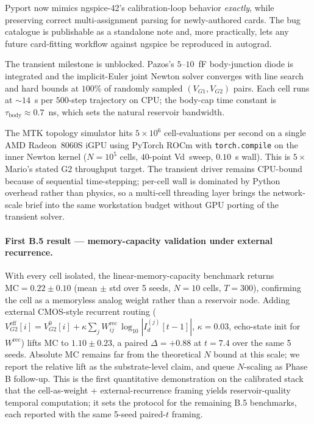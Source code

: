 \documentclass[fontsize=10pt]{article}
\begin{document}
Pyport now mimics ngspice-42's calibration-loop behavior \emph{exactly}, while
preserving correct multi-assignment parsing for newly-authored cards. The bug
catalogue is publishable as a standalone note and, more practically, lets any
future card-fitting workflow against ngspice be reproduced in autograd.

The transient milestone is unblocked. Pazos's $5$--$10$~fF body-junction diode is
integrated and the implicit-Euler joint Newton solver converges with line search and
hard bounds at $100\%$ of randomly sampled $(V_{G1}, V_{G2})$ pairs. Each cell runs at
$\sim 14$~s per $500$-step trajectory on CPU; the body-cap time constant is
$\tau_{\mathrm{body}} \approx 0.7$~ns, which sets the natural reservoir bandwidth.

The MTK topology simulator hits $5 \times 10^6$ cell-evaluations per second on a
single AMD Radeon~8060S iGPU using PyTorch ROCm with \texttt{torch.compile} on the
inner Newton kernel ($N=10^5$ cells, $40$-point Vd~sweep, $0.10$~s wall). This is
$5\times$ Mario's stated G2 throughput target. The transient driver remains CPU-bound
because of sequential time-stepping; per-cell wall is dominated by Python overhead
rather than physics, so a multi-cell threading layer brings the network-scale brief
into the same workstation budget without GPU porting of the transient solver.

\paragraph{First B.5 result --- memory-capacity validation under external recurrence.}
With every cell isolated, the linear-memory-capacity benchmark returns
$\mathrm{MC} = 0.22 \pm 0.10$ (mean $\pm$ std over 5 seeds, $N=10$ cells, $T=300$),
confirming the cell as a memoryless analog weight rather than a reservoir node.
Adding external CMOS-style recurrent routing
($V_{G2}^{\mathrm{eff}}[i] = V_{G2}^{0}[i] + \kappa \sum_j W^{\mathrm{rec}}_{ij}\,
\log_{10}|I_d^{(j)}[t-1]|$, $\kappa = 0.03$, echo-state init for $W^{\mathrm{rec}}$)
lifts $\mathrm{MC}$ to $\mathbf{1.10 \pm 0.23}$, a paired $\Delta = +0.88$ at
$t = 7.4$ over the same 5 seeds. Absolute $\mathrm{MC}$ remains far from the
theoretical $N$ bound at this scale; we report the relative lift as the
substrate-level claim, and queue $N$-scaling as Phase B follow-up. This is the
first quantitative demonstration on the calibrated stack that the
cell-as-weight + external-recurrence framing yields reservoir-quality temporal
computation; it sets the protocol for the remaining B.5 benchmarks, each
reported with the same 5-seed paired-$t$ framing.
\end{document}
